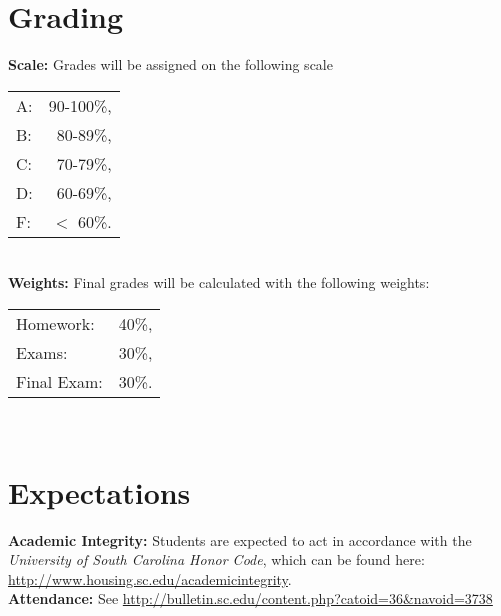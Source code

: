 \documentclass[10pt]{amsart}
\begin{document}
            \section*{Grading}
                     {\bf Scale:} Grades will be assigned on the following scale\\
                     \indent
                     \begin{tabular}{lr}
                       A: &90-100\%,\\
                       B: & 80-89\%,\\
                       C: & 70-79\%,\\
                       D: & 60-69\%,\\
                       F: & $<$ 60\%.\\
                     \end{tabular}\\
                                  {\bf Weights:} Final grades will be calculated with the following weights:\\
                                  \indent \begin{tabular}{lr}
                                    Homework: & 40\%,\\
                                    Exams: & 30\%,\\
                                    Final Exam: & 30\%.\\
                                  \end{tabular}\\
                                  \section*{Expectations}
                                  \noindent
                                      {\bf Academic Integrity:} Students are expected to act in accordance with the {\it University of South Carolina Honor Code}, 
                                      which can be found here: \url{http://www.housing.sc.edu/academicintegrity}.\\
                                      {\bf Attendance:} See \url{http://bulletin.sc.edu/content.php?catoid=36\&navoid=3738}
\end{document}
